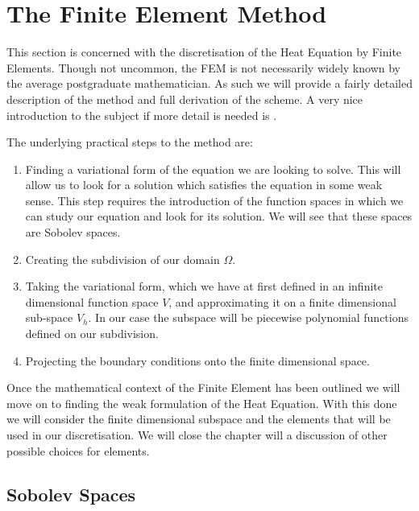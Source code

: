 \documentclass{uonmathreport}
\theoremstyle{definition}
\theoremstyle{problem}
\theoremstyle{theorem}
\begin{document}
\clearpage

\section{The Finite Element Method} \label{sec:FEM}

This section is concerned with the discretisation of the Heat Equation by Finite Elements. Though not uncommon, the FEM is not necessarily widely known by the average postgraduate mathematician. As such we will provide a fairly detailed description of the method and full derivation of the scheme. A very nice introduction to the subject if more detail is needed is \cite{larson2013finite}.

The underlying practical steps to the method are:

\begin{enumerate}
\item Finding a variational form of the equation we are looking to solve. This will allow us to look for a solution which satisfies the equation in some weak sense. This step requires the introduction of the function spaces in which we can study our  equation and look for its solution. We will see that these spaces are Sobolev spaces.

\item Creating the subdivision of our domain $\Omega$.

\item Taking the variational form, which we have at first defined in an infinite dimensional function space $V$, and approximating it on a finite dimensional sub-space $V_{h}$. In our case the subspace will be piecewise polynomial functions defined on our subdivision.

\item Projecting the boundary conditions onto the finite dimensional space.
\end{enumerate}

Once the mathematical context of the Finite Element has been outlined we will move on to finding the weak formulation of the Heat Equation. With this done we will consider the finite dimensional subspace and the elements that will be used in our discretisation. We will close the chapter will a discussion of other possible choices for elements.

\subsection{Sobolev Spaces} \label{subsec:Sobolev}
\end{document}
